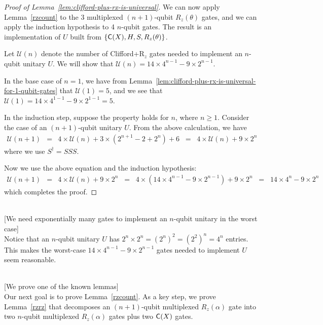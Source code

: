\documentclass[11pt]{article}
\def\({\begin{eqnarray*}}
\def\){\end{eqnarray*}}
\def\C#1{\text{\sf C}{(#1)}}
\begin{document}
\begin{proof}[Proof of Lemma~\ref{lem:clifford-plus-rx-is-universal}]
We can now apply Lemma~\ref{rzcount} to 
the 3 multiplexed $(n+1)$-qubit $R_z(\theta)$ gates, and
we can apply the induction hypothesis to 
4 $n$-qubit gates.
The result is an implementation of $U$ built from 
$\{\C{X}, H, S, R_z(\theta)\}$.

Let $\mathcal{U}(n)$ denote the number of Clifford+R$_z$ gates
needed to implement an $n$-qubit unitary $U$.
We will show that
$\mathcal{U}(n) = 14 \times 4^{n-1} - 9 \times 2^{n-1}$.

In the base case of $n=1$, we have from 
Lemma~\ref{lem:clifford-plus-rx-is-universal-for-1-qubit-gates}
that
$\mathcal{U}(1) = 5$, and we see that
$\mathcal{U}(1) = 14 \times 4^{1-1} - 9 \times 2^{1-1} = 5$.

In the induction step, suppose the property holds for $n$,
where $n \geq 1$.
Consider the case of an $(n+1)$-qubit unitary $U$.
From the above calculation, we have
\(
\mathcal{U}(n+1) &=& 
4 \times \mathcal{U}(n) + 3 \times (2^{n+1} - 2 + 2^n) + 6
\;\;=\;\;
4 \times \mathcal{U}(n) + 9 \times 2^n
\)
where we use $S^\dag = SSS$.

Now we use the above equation and the induction hypothesis:
\begin{eqnarray}
\mathcal{U}(n+1)
& = &     4 \times \mathcal{U}(n) + 9 \times 2^n \nonumber
\;\;=\;\; 4 \times (14 \times 4^{n-1} - 9 \times 2^{n-1}) + 9 \times 2^n
\;\;=\;\;       14 \times 4^n - 9 \times 2^n \nonumber
\end{eqnarray}
which completes the proof.
\end{proof}

\mbox{} \\ \hspace*{1cm}
   [We need exponentially many gates to implement an $n$-qubit unitary in the worst case] \\
Notice that an $n$-qubit unitary $U$ has 
$2^n \times 2^n = (2^n)^2 = (2^2)^n = 4^n$ entries.
This makes the worst-case $14 \times 4^{n-1} - 9 \times 2^{n-1}$ gates 
needed to implement $U$ seem reasonable.

\mbox{} \\ \hspace*{1cm}
   [We prove one of the known lemmas] \\
Our next goal is to prove Lemma~\ref{rzcount}.
As a key step, we prove Lemma~\ref{rzrz} that decomposes 
an $(n+1)$-qubit multiplexed $R_z(\alpha)$ gate
into 
two $n$-qubit multiplexed $R_z(\alpha)$ gates 
plus
two $\C{X}$ gates.
\end{document}

